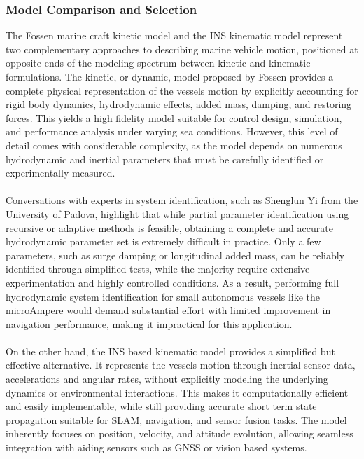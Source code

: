 \subsubsection{Model Comparison and Selection}
The Fossen marine craft kinetic model and the INS kinematic model represent two complementary approaches to describing marine vehicle motion, positioned at opposite ends of the modeling spectrum between kinetic and kinematic formulations. The kinetic, or dynamic, model proposed by Fossen provides a complete physical representation of the vessels motion by explicitly accounting for rigid body dynamics, hydrodynamic effects, added mass, damping, and restoring forces. This yields a high fidelity model suitable for control design, simulation, and performance analysis under varying sea conditions. However, this level of detail comes with considerable complexity, as the model depends on numerous hydrodynamic and inertial parameters that must be carefully identified or experimentally measured.  
\\ \\
Conversations with experts in system identification, such as Shenglun Yi from the University of Padova, highlight that while partial parameter identification using recursive or adaptive methods is feasible, obtaining a complete and accurate hydrodynamic parameter set is extremely difficult in practice. Only a few parameters, such as surge damping or longitudinal added mass, can be reliably identified through simplified tests, while the majority require extensive experimentation and highly controlled conditions. As a result, performing full hydrodynamic system identification for small autonomous vessels like the microAmpere would demand substantial effort with limited improvement in navigation performance, making it impractical for this application.  
\\ \\
On the other hand, the INS based kinematic model provides a simplified but effective alternative. It represents the vessels motion through inertial sensor data, accelerations and angular rates, without explicitly modeling the underlying dynamics or environmental interactions. This makes it computationally efficient and easily implementable, while still providing accurate short term state propagation suitable for SLAM, navigation, and sensor fusion tasks. The model inherently focuses on position, velocity, and attitude evolution, allowing seamless integration with aiding sensors such as GNSS or vision based systems.  
\\ \\
